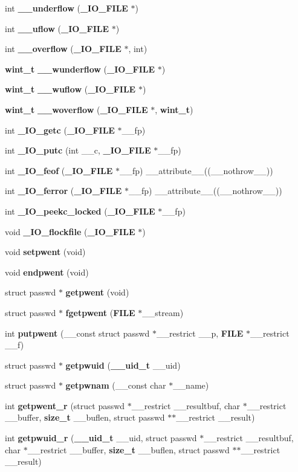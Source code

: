 \begin{DoxyCompactItemize}
\item 
int {\bf \_\-\_\-underflow} ({\bf \_\-IO\_\-FILE} $\ast$)
\item 
int {\bf \_\-\_\-uflow} ({\bf \_\-IO\_\-FILE} $\ast$)
\item 
int {\bf \_\-\_\-overflow} ({\bf \_\-IO\_\-FILE} $\ast$, int)
\item 
{\bf wint\_\-t} {\bf \_\-\_\-wunderflow} ({\bf \_\-IO\_\-FILE} $\ast$)
\item 
{\bf wint\_\-t} {\bf \_\-\_\-wuflow} ({\bf \_\-IO\_\-FILE} $\ast$)
\item 
{\bf wint\_\-t} {\bf \_\-\_\-woverflow} ({\bf \_\-IO\_\-FILE} $\ast$, {\bf wint\_\-t})
\item 
int {\bf \_\-IO\_\-getc} ({\bf \_\-IO\_\-FILE} $\ast$\_\-\_\-fp)
\item 
int {\bf \_\-IO\_\-putc} (int \_\-\_\-c, {\bf \_\-IO\_\-FILE} $\ast$\_\-\_\-fp)
\item 
int {\bf \_\-IO\_\-feof} ({\bf \_\-IO\_\-FILE} $\ast$\_\-\_\-fp) \_\-\_\-attribute\_\-\_\-((\_\-\_\-nothrow\_\-\_\-))
\item 
int {\bf \_\-IO\_\-ferror} ({\bf \_\-IO\_\-FILE} $\ast$\_\-\_\-fp) \_\-\_\-attribute\_\-\_\-((\_\-\_\-nothrow\_\-\_\-))
\item 
int {\bf \_\-IO\_\-peekc\_\-locked} ({\bf \_\-IO\_\-FILE} $\ast$\_\-\_\-fp)
\item 
void {\bf \_\-IO\_\-flockfile} ({\bf \_\-IO\_\-FILE} $\ast$)
\item 
void {\bf setpwent} (void)
\item 
void {\bf endpwent} (void)
\item 
struct passwd $\ast$ {\bf getpwent} (void)
\item 
struct passwd $\ast$ {\bf fgetpwent} ({\bf FILE} $\ast$\_\-\_\-stream)
\item 
int {\bf putpwent} (\_\-\_\-const struct passwd $\ast$\_\-\_\-restrict \_\-\_\-p, {\bf FILE} $\ast$\_\-\_\-restrict \_\-\_\-f)
\item 
struct passwd $\ast$ {\bf getpwuid} ({\bf \_\-\_\-uid\_\-t} \_\-\_\-uid)
\item 
struct passwd $\ast$ {\bf getpwnam} (\_\-\_\-const char $\ast$\_\-\_\-name)
\item 
int {\bf getpwent\_\-r} (struct passwd $\ast$\_\-\_\-restrict \_\-\_\-resultbuf, char $\ast$\_\-\_\-restrict \_\-\_\-buffer, {\bf size\_\-t} \_\-\_\-buflen, struct passwd $\ast$$\ast$\_\-\_\-restrict \_\-\_\-result)
\item 
int {\bf getpwuid\_\-r} ({\bf \_\-\_\-uid\_\-t} \_\-\_\-uid, struct passwd $\ast$\_\-\_\-restrict \_\-\_\-resultbuf, char $\ast$\_\-\_\-restrict \_\-\_\-buffer, {\bf size\_\-t} \_\-\_\-buflen, struct passwd $\ast$$\ast$\_\-\_\-restrict \_\-\_\-result)

\end{DoxyCompactItemize}
